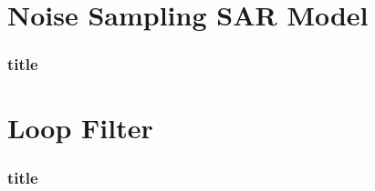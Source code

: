 
\section{Noise Sampling SAR Model}

\begin{frame}
\frametitle{title}
\end{frame}

\section{Loop Filter}

\begin{frame}
    \frametitle{title}
\end{frame} 